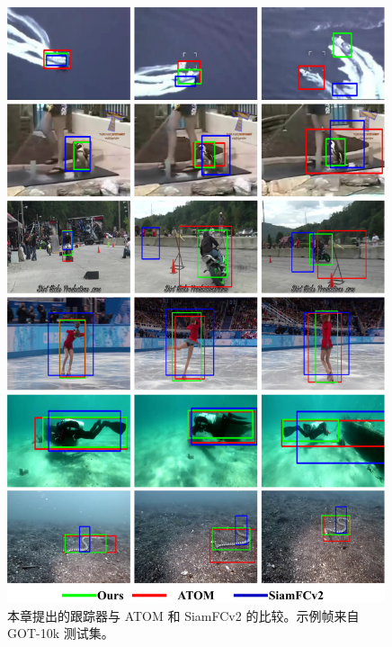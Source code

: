 \begin{figure}[p]
    \centering
    \includegraphics[width=0.99\textwidth]{Img/MTP/got10k/visulization.pdf}
    \caption{本章提出的跟踪器与 ATOM \cite{danelljan2019atom} 和 SiamFCv2 \cite{SiamFC} 的比较。示例帧来自 GOT-10k \cite{GOT-10k} 测试集。}
    \label{fig:MTP_vis}
\end{figure}

